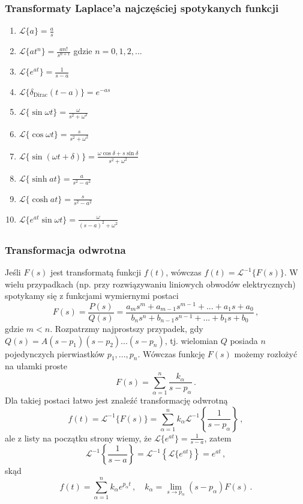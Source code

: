 \documentclass[../main.tex]{subfiles}
\begin{document}
\subsubsection*{Transformaty Laplace'a najczęściej spotykanych funkcji}
\begin{enumerate}
    \item \(\mathscr{L}\{a\}=\frac{a}{s}\)
    \item \(\mathscr{L}\{at^n\}=\frac{an!}{s^{n+1}}\) gdzie \(n=0,1,2,...\)
    \item \(\mathscr{L}\{e^{at}\}=\frac{1}{s-a}\)
    \item \(\mathscr{L}\{\delta_\text{Dirac} (t-a)\}=e^{-as}\)
    \item \(\mathscr{L}\{\sin \omega t\}=\frac{\omega }{s^2+\omega^2}\)
    \item \(\mathscr{L}\{\cos\omega t\}=\frac{s}{s^2+\omega^2}\)
    \item \(\mathscr{L}\{\sin(\omega t+\delta)\}=\frac{\omega\cos\delta+s\sin\delta}{s^2+\omega^2}\)
    \item \(\mathscr{L}\{\sinh{at}\}=\frac{a}{s^2-a^2}\)
    \item \(\mathscr{L}\{\cosh at\}=\frac{s}{s^2-a^2}\)
    \item \(\mathscr{L}\{e^{at}\sin \omega t\}=\frac{\omega}{(s-a)^2+\omega^2}\)
\end{enumerate}
\subsubsection*{Transformacja odwrotna}
Jeśli \(F(s)\) jest transformatą funkcji \(f(t)\), wówczas \(f(t)=\mathscr{L}^{-1}\{F(s)\}\). W
wielu przypadkach (np. przy rozwiązywaniu liniowych obwodów elektrycznych) spotykamy się z funkcjami
wymiernymi postaci
\begin{equation*}
    F(s)=\frac{P(s)}{Q(s)}=\frac{a_m s^m+a_{m-1}s^{m-1}+...+a_1s+a_0}{b_n s^n+b_{n-1}s^{n-1}+...+b_1s+b_0}\,,
\end{equation*}
gdzie \(m<n\). Rozpatrzmy najprostszy przypadek, gdy \(Q(s)=A (s-p_1)(s-p_2)...(s-p_n)\), tj.
wielomian \(Q\) posiada \(n\) pojedynczych pierwiastków \(p_1,...,p_n\). Wówczas funkcję \(F(s)\)
możemy rozłożyć na ułamki proste
\begin{equation*}
    F(s)=\sum_{\alpha=1}^n\frac{k_\alpha}{s-p_\alpha}\,.
\end{equation*}
Dla takiej postaci łatwo jest znaleźć transformację odwrotną
\begin{equation*}
    f(t)=\mathscr{L}^{-1}\{F(s)\}=\sum_{\alpha=1}^nk_\alpha\mathscr{L}^{-1}\left\{\frac{1}{s-p_\alpha}\right\}\,,
\end{equation*}
ale z listy na początku strony wiemy, że \(\mathscr{L}\{e^{at}\}=\frac{1}{s-a}\), zatem 
\begin{equation*}
    \mathscr{L}^{-1}\left\{\frac{1}{s-a}\right\}=\mathscr{L}^{-1}\left\{\mathscr{L}\{e^{at}\}\right\}=e^{at}\,,
\end{equation*}
skąd
\begin{equation*}
    f(t)=\sum_{\alpha=1}^nk_\alpha e^{p_\alpha t}\,,\quad k_\alpha=\lim_{s\to p_\alpha} (s-p_\alpha)F(s)\,.
\end{equation*}
\end{document}
